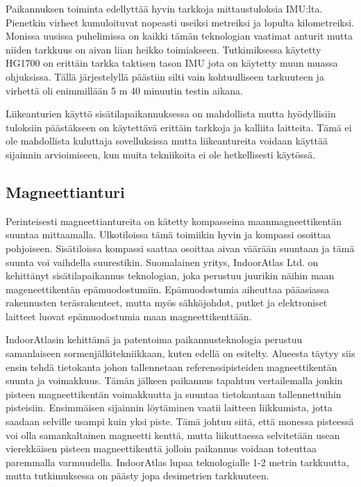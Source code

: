 Paikannuksen toiminta edellyttää hyvin tarkkoja mittaustuloksia IMU:lta. Pienetkin virheet kumuloituvat nopeasti useiksi metreiksi ja lopulta kilometreiksi. Monissa uusissa puhelimissa on kaikki tämän teknologian vaatimat anturit mutta niiden tarkkuus on aivan liian heikko toimiakseen. Tutkimiksessa\cite{IMU} käytetty HG1700 on erittäin tarkka taktisen tason IMU jota on käytetty muun muassa ohjuksissa\cite{hg1700}. Tällä järjestelyllä päästiin silti vain kohtuulliseen tarkuuteen ja virhettä oli enimmillään 5 m 40 minuutin testin aikana\cite{IMU}. 

Liikeanturien käyttö sisätilapaikannuksessa on mahdollista mutta hyödyllisiin tuloksiin päästäkseen on käytettävä erittäin tarkkoja ja kalliita laitteita. Tämä ei ole mahdollista kuluttaja sovelluksissa mutta liikeantureita voidaan käyttää sijainnin arvioimiseen, kun muita tekniikoita ei ole hetkellisesti käytössä.
\subsection{Magneettianturi}
Perinteisesti magneettiantureita on kätetty kompasseina maanmagneettikentän suuntaa mittaamalla. Ulkotiloissa tämä toimiikin hyvin ja kompassi osoittaa pohjoiseen. Sisätiloissa kompassi saattaa osoittaa aivan väärään suuntaan ja tämä suunta voi vaihdella suurestikin. Suomalainen yritys, IndoorAtlas Ltd. on kehittänyt sisätilapaikannus teknologian, joka perustuu juurikin näihin maan mageneettikentän epämuodostumiin\cite{atlas}. Epämuodostumia aiheuttaa pääasiassa rakennusten teräsrakenteet, mutta myös sähköjohdot, putket ja elektroniset laitteet luovat epämuodostumia maan magneettikenttään\cite{magneetti}.

IndoorAtlasin kehittämä ja patentoima paikannusteknologia perustuu samanlaiseen sormenjälkitekniikkaan, kuten edellä on esitelty. Alueesta täytyy siis ensin tehdä tietokanta johon tallennetaan referenssipisteiden magneettikentän suunta ja voimakkuus\cite{atlas}. Tämän jälkeen paikannus tapahtuu vertailemalla jonkin pisteen magneettikentän voimakkuutta ja suuntaa tietokantaan tallennettuihin pisteisiin. Ensimmäisen sijainnin löytäminen vaatii laitteen liikkumista, jotta saadaan selville usampi kuin yksi piste\cite{atlas}. Tämä johtuu siitä, että monessa pisteessä voi olla samankaltainen magneetti kenttä, mutta liikuttaessa selvitetään usean vierekkäisen pisteen magneettikenttä jolloin paikannus voidaan toteuttaa paremmalla varmuudella.
IndoorAtlas lupaa teknologialle 1-2 metrin tarkkuutta\cite{atlas}, mutta tutkimuksessa\cite{magneetti} on päästy jopa desimetrien tarkkuuteen.

